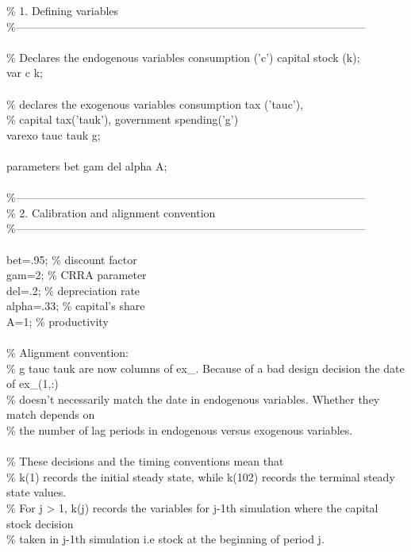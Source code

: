 \documentclass[a4paper,12pt]{scrartcl} %
\begin{document}
\% 1. Defining variables\\
\%-----------------------------------------------------------------------------------------------\\
\\
\% Declares the endogenous variables consumption ('c') capital stock (k);\\
var c k;\\
\\
\% declares the exogenous variables consumption tax ('tauc'),\\
\% capital tax('tauk'), government spending('g')\\
varexo tauc tauk g;\\
\\
parameters bet gam del alpha A;\\
\\
\%-----------------------------------------------------------------------------------------------\\
\% 2. Calibration and alignment convention\\
\%-----------------------------------------------------------------------------------------------\\
\\
bet=.95;  \% discount factor\\
gam=2;    \% CRRA parameter\\
del=.2;  \%  depreciation rate\\
alpha=.33; \%  capital's share\\
A=1;    \% productivity\\
\\
\% Alignment convention:\\
\% g tauc tauk are now columns of ex\_. Because of a bad design decision  the date of ex\_(1,:)\\
\% doesn't necessarily match the date in endogenous variables. Whether they match depends on\\
\% the number of lag periods in endogenous versus exogenous variables.\\
\\
\% These decisions and the timing conventions mean that\\
\% k(1) records the initial steady state, while k(102) records the terminal steady state values.\\
\% For j > 1, k(j) records the variables for j-1th simulation where the capital stock decision\\
\% taken in j-1th simulation i.e stock at the beginning of period j.\\
\end{document}
